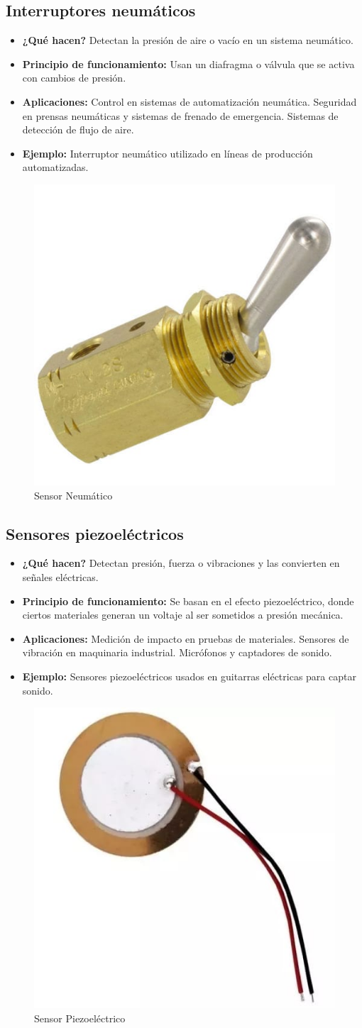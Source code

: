 \subsection*{Interruptores neumáticos}
\begin{itemize}
	\item \textbf{¿Qué hacen?} Detectan la presión de aire o vacío en un sistema neumático.
	\item \textbf{Principio de funcionamiento:} Usan un diafragma o válvula que se activa con cambios de presión.
	\item \textbf{Aplicaciones:} Control en sistemas de automatización neumática.
	Seguridad en prensas neumáticas y sistemas de frenado de emergencia.
	Sistemas de detección de flujo de aire.
	\item \textbf{Ejemplo:} Interruptor neumático utilizado en líneas de producción automatizadas.
\end{itemize}
\begin{figure}[h]
	\centering
	\includegraphics[width=0.2\linewidth]{img/sensor neumatico}
	\caption{Sensor Neumático}
	\label{fig:sensor neumatico}
\end{figure}

\subsection*{Sensores piezoeléctricos}
\begin{itemize}
	\item \textbf{¿Qué hacen?} Detectan presión, fuerza o vibraciones y las convierten en señales eléctricas.
	\item \textbf{Principio de funcionamiento:} Se basan en el efecto piezoeléctrico, donde ciertos materiales generan un voltaje al ser sometidos a presión mecánica.
	\item \textbf{Aplicaciones:} Medición de impacto en pruebas de materiales.
	Sensores de vibración en maquinaria industrial.
	Micrófonos y captadores de sonido.
	\item \textbf{Ejemplo:} Sensores piezoeléctricos usados en guitarras eléctricas para captar sonido.
\end{itemize}
\begin{figure}[h]
	\centering
	\includegraphics[width=0.2\linewidth]{img/sensor piezoelectrico}
	\caption{Sensor Piezoeléctrico}
	\label{fig:sensor piezoelectrico}
\end{figure}

